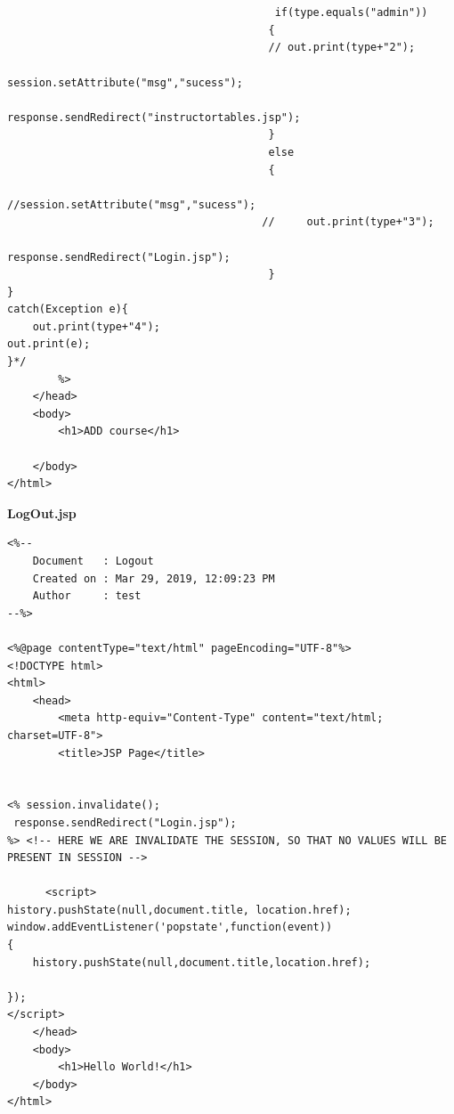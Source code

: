 \begin{lstlisting}
                                         
                                         
                                          if(type.equals("admin"))
                                         {
                                         // out.print(type+"2");
                                             session.setAttribute("msg","sucess");
                                             response.sendRedirect("instructortables.jsp");   
                                         }
                                         else
                                         {
                                             //session.setAttribute("msg","sucess");
                                        //     out.print(type+"3");
                                             response.sendRedirect("Login.jsp");
                                         }
}
catch(Exception e){
    out.print(type+"4");
out.print(e);
}*/
        %>
    </head>
    <body>
        <h1>ADD course</h1>
            
    </body>
</html>

\end{lstlisting}

{\bf LogOut.jsp}
\begin{lstlisting}
<%-- 
    Document   : Logout
    Created on : Mar 29, 2019, 12:09:23 PM
    Author     : test
--%>

<%@page contentType="text/html" pageEncoding="UTF-8"%>
<!DOCTYPE html>
<html>
    <head>
        <meta http-equiv="Content-Type" content="text/html; charset=UTF-8">
        <title>JSP Page</title>
        
    
<% session.invalidate();
 response.sendRedirect("Login.jsp");
%> <!-- HERE WE ARE INVALIDATE THE SESSION, SO THAT NO VALUES WILL BE PRESENT IN SESSION -->
		
	  <script>
history.pushState(null,document.title, location.href);
window.addEventListener('popstate',function(event))
{
    history.pushState(null,document.title,location.href);
    
});
</script>
    </head>
    <body>
        <h1>Hello World!</h1>
    </body>
</html>

\end{lstlisting}


